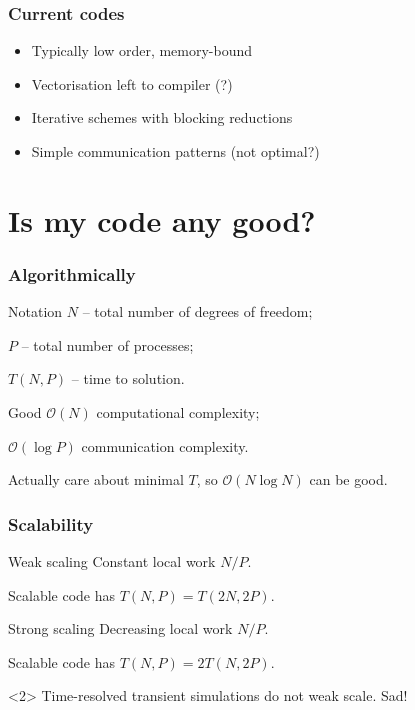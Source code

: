 \documentclass[presentation]{beamer}
\newcommand{\xmark}{\ding{55}}
\begin{document}
\begin{frame}
  \frametitle{Current codes}

  \begin{itemize}
  \item[\xmark] Typically low order, memory-bound
  \item[\xmark] Vectorisation left to compiler (?)
  \item[\xmark] Iterative schemes with blocking reductions
  \item[\xmark] Simple communication patterns (not optimal?)
  \end{itemize}
\end{frame}


\section{Is my code any good?}

\begin{frame}
  \frametitle{Algorithmically}

  \begin{block}{Notation}
  $N$ -- total number of degrees of freedom;

  $P$ -- total number of processes;

  $T(N, P)$ -- time to solution.
  \end{block}

  \begin{block}{Good}
    $\mathcal{O}(N)$ computational complexity;

    $\mathcal{O}(\log P)$ communication complexity.

    Actually care about minimal $T$, so $\mathcal{O}(N\log N)$ can be good.
  \end{block}
\end{frame}

\begin{frame}
  \frametitle{Scalability}

  \begin{block}{Weak scaling}
    Constant local work $N/P$.

    Scalable code has $T(N, P) = T(2N, 2P)$.
  \end{block}

  \begin{block}{Strong scaling}
    Decreasing local work $N/P$.

    Scalable code has $T(N, P) = 2T(N, 2P)$.
  \end{block}

  \begin{onlyenv}<2>
    Time-resolved transient simulations do not weak scale. Sad!
  \end{onlyenv}
\end{frame}
\end{document}
